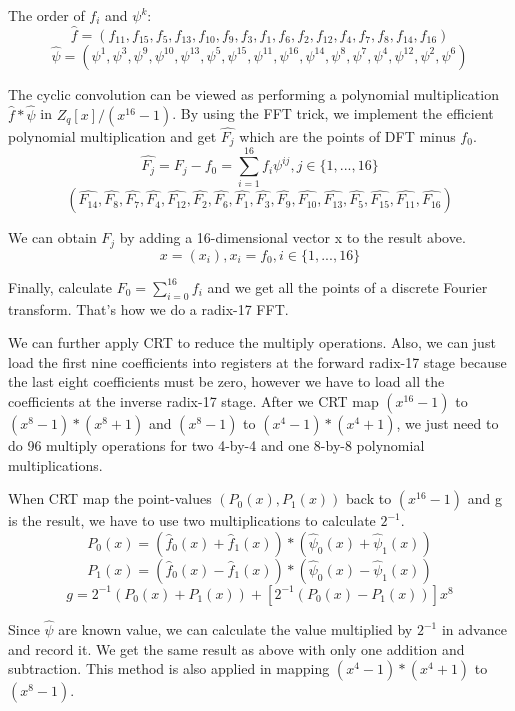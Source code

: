 \documentclass[11pt, a4paper]{article} %
\begin{document}
The order of $ f_i $ and $ \psi^k $:
\[ 
\hat{f} = (f_{11}, f_{15}, f_5, f_{13}, f_{10}, f_9, f_3, f_1, f_6, f_2, f_{12}, f_4, f_7, f_8, f_{14}, f_{16})
 \]
\[ 
\hat{\psi} = (\psi^{1},\psi^{3},\psi^9,\psi^{10} ,\psi^{13},\psi^5, \psi^{15} ,\psi^{11} ,\psi^{16} ,\psi^{14} ,\psi^{8} ,\psi^7 ,\psi^4 ,\psi^{12},\psi^{2},\psi^{6})
 \]

The cyclic convolution can be viewed as performing a polynomial multiplication $ \hat{f} * \hat{\psi} $ in $ Z_q[x] / (x^{16} - 1) $. By using the FFT trick, we implement the efficient polynomial multiplication and get $ \hat{F_j} $ which are the points of DFT minus $ f_0 $.
\[
\hat{F_j} = F_j - f_0 = \sum_{i = 1}^{16} f_{i} \psi^{ij}, j \in \{1,...,16\}
\]
\[
(\hat{F_{14}},\hat{F_8},\hat{F_7},\hat{F_4},\hat{F_{12}},\hat{F_2},\hat{F_6},\hat{F_1}, \hat{F_3},\hat{F_9},\hat{F_{10}},\hat{F_{13}},\hat{F_5},\hat{F_{15}},\hat{F_{11}},\hat{F_{16}})
\]

We can obtain $ F_j $ by adding a 16-dimensional vector x to the result above.
\[
x = (x_i), x_i = f_0, i \in \{1,...,16\}
\]

Finally, calculate $ F_0 = \sum_{i = 0}^{16} f_{i} $ and we get all the points of a discrete Fourier transform. That's how we do a radix-17 FFT.

We can further apply CRT to reduce the multiply operations. Also, we can just load the first nine coefficients into registers at the forward radix-17 stage because the last eight coefficients must be zero, however we have to load all the coefficients at the inverse radix-17 stage.  After we CRT map ${(x^{16} - 1)}$ to ${(x^{8} - 1) * (x^{8} + 1)}$ and  ${(x^{8} - 1)}$ to ${(x^{4} - 1) * (x^{4} + 1)}$, we just need to do 96 multiply operations for two 4-by-4 and one 8-by-8 polynomial multiplications.

When CRT map the point-values $ (P_0(x), P_1(x)) $ back to ${(x^{16} - 1)}$ and g is the result, we have to use two multiplications to calculate $ 2^{-1} $.
\[
    P_0(x) = (\hat{f}_0(x) + \hat{f}_1(x)) * (\hat{\psi}_0(x) + \hat{\psi}_1(x))
\]
\[
    P_1(x) = (\hat{f}_0(x) - \hat{f}_1(x)) * (\hat{\psi}_0(x) - \hat{\psi}_1(x))
\]
\[
    g = 2^{-1}(P_0(x) + P_1(x)) + [2^{-1}(P_0(x) - P_1(x))]x^8
\]

Since $ \hat{\psi} $ are known value, we can calculate the value multiplied by $ 2^{-1} $ in advance and record it. We get the same result as above with only one addition and subtraction. This method is also applied in mapping ${(x^{4} - 1) * (x^{4} + 1)}$ to ${(x^{8} - 1)}$.
\end{document}
